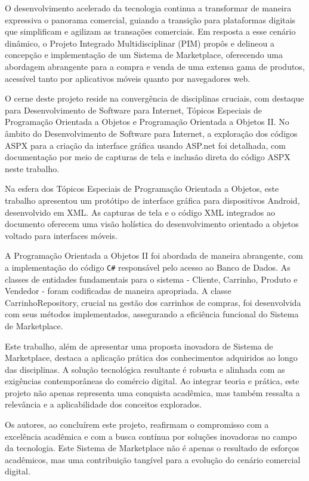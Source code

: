 \documentclass[
	12pt,				%
	openright,			%
	twoside,			%
	a4paper,			%
	english,			%
	brazil				%
	]{abntex2}
\begin{document}
O desenvolvimento acelerado da tecnologia continua a transformar de maneira expressiva o panorama comercial, guiando a transição para plataformas digitais que simplificam e agilizam as transações comerciais. Em resposta a esse cenário dinâmico, o Projeto Integrado Multidisciplinar (PIM) propôs e delineou a concepção e implementação de um Sistema de Marketplace, oferecendo uma abordagem abrangente para a compra e venda de uma extensa gama de produtos, acessível tanto por aplicativos móveis quanto por navegadores web.

O cerne deste projeto reside na convergência de disciplinas cruciais, com destaque para Desenvolvimento de Software para Internet, Tópicos Especiais de Programação Orientada a Objetos e Programação Orientada a Objetos II. No âmbito do Desenvolvimento de Software para Internet, a exploração dos códigos ASPX para a criação da interface gráfica usando ASP.net foi detalhada, com documentação por meio de capturas de tela e inclusão direta do código ASPX neste trabalho.

Na esfera dos Tópicos Especiais de Programação Orientada a Objetos, este trabalho apresentou um protótipo de interface gráfica para dispositivos Android, desenvolvido em XML. As capturas de tela e o código XML integrados ao documento oferecem uma visão holística do desenvolvimento orientado a objetos voltado para interfaces móveis.

A Programação Orientada a Objetos II foi abordada de maneira abrangente, com a implementação do código \texttt{C\#} responsável pelo acesso ao Banco de Dados. As classes de entidades fundamentais para o sistema - Cliente, Carrinho, Produto e Vendedor - foram codificadas de maneira apropriada. A classe CarrinhoRepository, crucial na gestão dos carrinhos de compras, foi desenvolvida com seus métodos implementados, assegurando a eficiência funcional do Sistema de Marketplace.

Este trabalho, além de apresentar uma proposta inovadora de Sistema de Marketplace, destaca a aplicação prática dos conhecimentos adquiridos ao longo das disciplinas. A solução tecnológica resultante é robusta e alinhada com as exigências contemporâneas do comércio digital. Ao integrar teoria e prática, este projeto não apenas representa uma conquista acadêmica, mas também ressalta a relevância e a aplicabilidade dos conceitos explorados.

Os autores, ao concluírem este projeto, reafirmam o compromisso com a excelência acadêmica e com a busca contínua por soluções inovadoras no campo da tecnologia. Este Sistema de Marketplace não é apenas o resultado de esforços acadêmicos, mas uma contribuição tangível para a evolução do cenário comercial digital.
\end{document}
